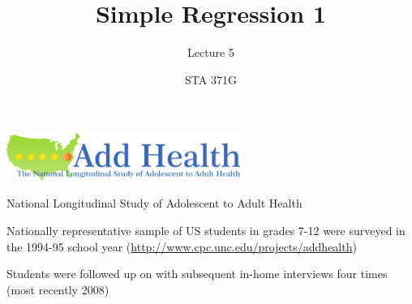 \documentclass{beamer}\usepackage[]{graphicx}\usepackage[]{color}
\title{Simple Regression 1}
\subtitle{Lecture 5}
\author{STA 371G}
\begin{document}
  
  
  

  \frame{\maketitle}



  \begin{darkframes}
    \begin{frame}
      \begin{center}
        \includegraphics[width=3in]{add-health}

        \bigskip
        National Longitudinal Study of Adolescent to Adult Health

        \bigskip
        Nationally representative sample of US students in grades 7-12 were surveyed in the 1994-95 school year (\url{http://www.cpc.unc.edu/projects/addhealth})

        \bigskip
        Students were followed up on with subsequent in-home interviews four times (most recently 2008)
      \end{center}
    \end{frame}


\end{darkframes}
\end{document}
